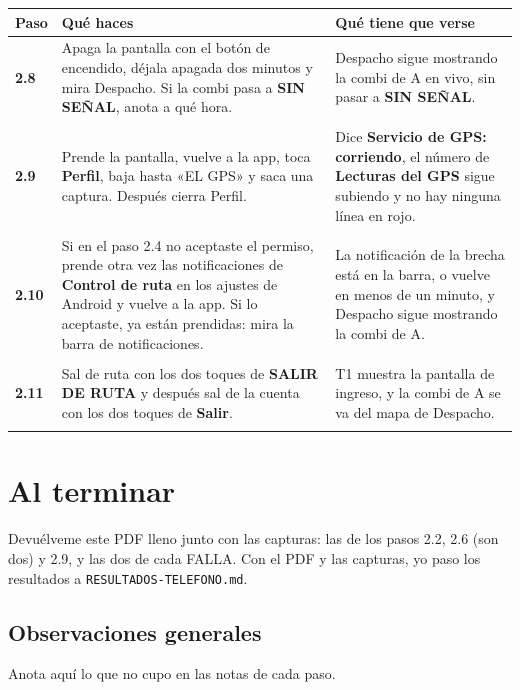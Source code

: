 \documentclass[10pt,a4paper]{article}
\makeatletter
\newcommand{\toca}[1]{\textcolor{azul}{\textbf{#1}}}
\newcommand{\pantalla}[1]{\textcolor{marron}{\textbf{#1}}}
\newcommand{\caja}[2]{\hbox{\vrule height #1 depth 0pt width 0pt #2}}
\newcommand{\campo}[3]{%
  \raisebox{-0.35\height}{\caja{#3}{\TextField[name=#1, width=#2, height=#3, charsize=8pt, bordercolor={0.55 0.6 0.68},
    backgroundcolor={0.965 0.976 0.992}, multiline=true]{}}}}
\newcommand{\resultado}[1]{%
  \caja{9pt}{\ChoiceMenu[radio, name=resultado-#1, width=9pt, height=9pt, radiosymbol=l,
    bordercolor={0.35 0.38 0.45}, default=]{}{OK=ok,FALLA=falla,NO SE PUDO=nopudo}}}
\newcommand{\paso}[4]{%
  \textbf{#1} & #3 & #4 \\*
  \multicolumn{3}{@{\hspace{6pt}}l@{}}{\rule{0pt}{15pt}\small
    \resultado{#2}\hspace{0.4em}Hora:~\campo{hora-#2}{1.7cm}{13pt}\hspace{1.2em}Nota:~\campo{nota-#2}{8.3cm}{22pt}}\\[3pt]
  \hline
}
\newenvironment{pasos}{%
  \begin{longtable}{@{\hspace{6pt}}>{\raggedright\arraybackslash}p{0.9cm}>{\raggedright\arraybackslash}p{7.9cm}>{\raggedright\arraybackslash}p{7.3cm}@{}}
  \rowcolor{cabecera}\textbf{Paso} & \textbf{Qué haces} & \textbf{Qué tiene que verse} \\ \hline
  \endhead
}{\end{longtable}\vspace{-0.6em}}
\makeatother
\begin{document}
\begin{Form}
\begin{pasos}
\paso{2.8}{2-8}{Apaga la pantalla con el botón de encendido, déjala apagada dos minutos y mira Despacho. Si la combi pasa a \pantalla{SIN SEÑAL}, anota a qué hora.}{Despacho sigue mostrando la combi de A en vivo, sin pasar a \pantalla{SIN SEÑAL}.}
\paso{2.9}{2-9}{Prende la pantalla, vuelve a la app, toca \toca{Perfil}, baja hasta «EL GPS» y saca una captura. Después cierra Perfil.}{Dice \pantalla{Servicio de GPS: corriendo}, el número de \pantalla{Lecturas del GPS} sigue subiendo y no hay ninguna línea en rojo.}
\paso{2.10}{2-10}{Si en el paso 2.4 no aceptaste el permiso, prende otra vez las notificaciones de \toca{Control de ruta} en los ajustes de Android y vuelve a la app. Si lo aceptaste, ya están prendidas: mira la barra de notificaciones.}{La notificación de la brecha está en la barra, o vuelve en menos de un minuto, y Despacho sigue mostrando la combi de A.}
\paso{2.11}{2-11}{Sal de ruta con los dos toques de \toca{SALIR DE RUTA} y después sal de la cuenta con los dos toques de \toca{Salir}.}{T1 muestra la pantalla de ingreso, y la combi de A se va del mapa de Despacho.}
\end{pasos}

\section{Al terminar}

Devuélveme este PDF lleno junto con las capturas: las de los pasos 2.2, 2.6 (son dos) y 2.9, y las dos de cada FALLA. Con el PDF y las capturas, yo paso los resultados a \texttt{RESULTADOS-TELEFONO.md}.

\subsection{Observaciones generales}

Anota aquí lo que no cupo en las notas de cada paso.

\TextField[name=observaciones, width=\linewidth, height=6cm, charsize=9pt, multiline=true,
  bordercolor={0.55 0.6 0.68}, backgroundcolor={0.965 0.976 0.992}]{}

\end{Form}
\end{document}
